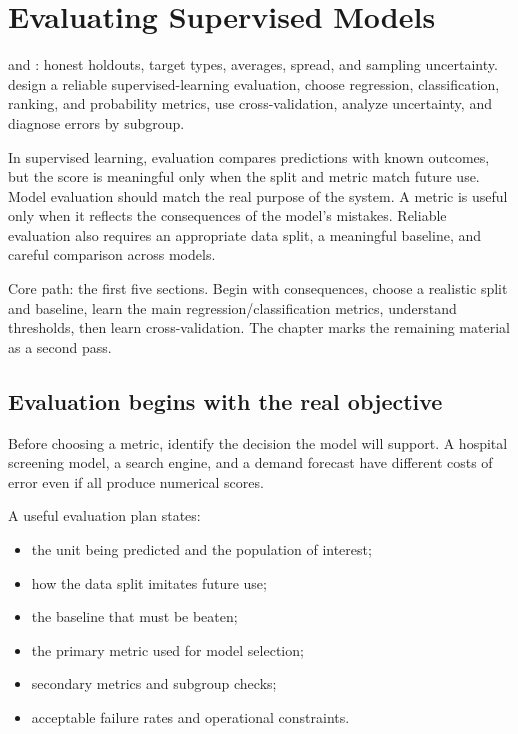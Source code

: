 \chapter{Evaluating Supervised Models}
\label{ch:evaluation}

\chapterguide%
  { and : honest holdouts, target types, averages, spread, and sampling uncertainty.}
  {design a reliable supervised-learning evaluation, choose regression, classification, ranking, and probability metrics, use cross-validation, analyze uncertainty, and diagnose errors by subgroup.}

In supervised learning, evaluation compares predictions with known outcomes, but the score is meaningful only when the split and metric match future use. Model evaluation should match the real purpose of the system. A metric is useful only when it reflects the consequences of the model's mistakes. Reliable evaluation also requires an appropriate data split, a meaningful baseline, and careful comparison across models.

\begin{firstread}
Core path: the first five sections. Begin with consequences, choose a realistic split and baseline, learn the main regression/classification metrics, understand thresholds, then learn cross-validation. The chapter marks the remaining material as a second pass.
\end{firstread}

\section{Evaluation begins with the real objective}

Before choosing a metric, identify the decision the model will support. A hospital screening model, a search engine, and a demand forecast have different costs of error even if all produce numerical scores.

A useful evaluation plan states:

\begin{itemize}
  \item the unit being predicted and the population of interest;
  \item how the data split imitates future use;
  \item the baseline that must be beaten;
  \item the primary metric used for model selection;
  \item secondary metrics and subgroup checks;
  \item acceptable failure rates and operational constraints.
\end{itemize}

